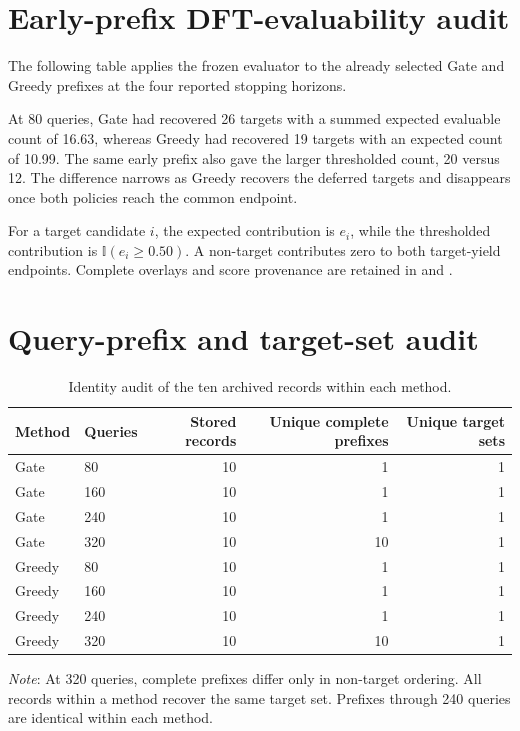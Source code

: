 \documentclass[cmc,article,submit,moreauthors,pdftex]{Definitions/tsp}
\newcommand{\tabnote}[1]{\par\smallskip\noindent\begin{minipage}{\linewidth}\footnotesize\emph{Note}: #1\end{minipage}\par}
\begin{document}
\section{Early-prefix DFT-evaluability audit}

The following table applies the frozen evaluator to the already selected Gate
and Greedy prefixes at the four reported stopping horizons.



At 80 queries, Gate had recovered 26 targets with a summed expected evaluable
count of 16.63, whereas Greedy had recovered 19 targets with an expected count
of 10.99. The same early prefix also gave the larger thresholded count, 20
versus 12. The difference narrows as Greedy recovers the deferred targets and
disappears once both policies reach the common endpoint.

For a target candidate $i$, the expected contribution is $e_i$, while the
thresholded contribution is $\mathbb{I}(e_i\geq0.50)$. A non-target contributes
zero to both target-yield endpoints. Complete overlays and score provenance are
retained in
 and
.

\section{Query-prefix and target-set audit}

\begin{table}[H]
\centering
\caption{Identity audit of the ten archived records within each method.}
\label{tab:s-prefix-audit}
\small
\begin{tabular}{llrrr}
\toprule
Method & Queries & Stored records & Unique complete prefixes & Unique target sets \\
\midrule
Gate & 80  & 10 & 1  & 1 \\
Gate & 160 & 10 & 1  & 1 \\
Gate & 240 & 10 & 1  & 1 \\
Gate & 320 & 10 & 10 & 1 \\
Greedy & 80  & 10 & 1  & 1 \\
Greedy & 160 & 10 & 1  & 1 \\
Greedy & 240 & 10 & 1  & 1 \\
Greedy & 320 & 10 & 10 & 1 \\
\bottomrule
\end{tabular}
\tabnote{At 320 queries, complete prefixes differ only in non-target ordering.
All records within a method recover the same target set. Prefixes through 240
queries are identical within each method.}
\end{table}
\end{document}
